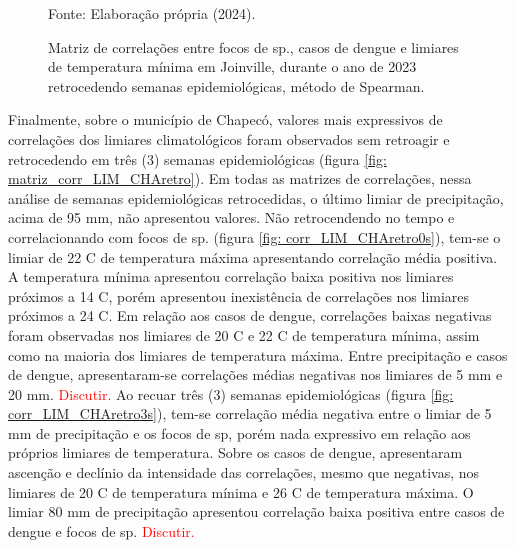 \documentclass[
	12pt,				%
	openright,			%
	oneside,			%
	a4paper,			%
	english,			%
	french,				%
	spanish,			%
	brazil				%
	dvipsnames, table]{abntex2}
\begin{document}
\begin{figure}[htbp]
    \begin{center}
    \caption{Matriz de correlações entre focos de  sp., casos de dengue e limiares de temperatura mínima em Joinville, durante o ano de 2023 retrocedendo semanas epidemiológicas, método de Spearman.}
    \label{fig: matriz_corr_LIM_JOItmax}
        \hfill
    \end{center}
    \small{Fonte: Elaboração própria (2024).}
\end{figure}


Finalmente, sobre o município de Chapecó, valores mais expressivos de correlações dos limiares climatológicos foram observados sem retroagir e retrocedendo em três (3) semanas epidemiológicas (figura \ref{fig: matriz_corr_LIM_CHAretro}). Em todas as matrizes de correlações, nessa análise de semanas epidemiológicas retrocedidas, o último limiar de precipitação, acima de 95 mm, não apresentou valores. Não retrocendendo no tempo e correlacionando com focos de  sp. (figura \ref{fig: corr_LIM_CHAretro0s}), tem-se o limiar de 22 C de temperatura máxima apresentando correlação média positiva. A temperatura mínima apresentou correlação baixa positiva nos limiares próximos a 14 C, porém apresentou inexistência de correlações nos limiares próximos a 24 C. Em relação aos casos de dengue, correlações baixas negativas foram observadas nos limiares de 20 C e 22 C de temperatura mínima, assim como na maioria dos limiares de temperatura máxima. Entre precipitação e casos de dengue, apresentaram-se correlações médias negativas nos limiares de 5 mm e 20 mm. \textcolor{red}{Discutir.} Ao recuar três (3) semanas epidemiológicas (figura \ref{fig: corr_LIM_CHAretro3s}), tem-se correlação média negativa entre o limiar de 5 mm de precipitação e os focos de  sp, porém nada expressivo em relação aos próprios limiares de temperatura. Sobre os casos de dengue, apresentaram ascenção e declínio da intensidade das correlações, mesmo que negativas, nos limiares de 20 C de temperatura mínima e 26 C de temperatura máxima. O limiar 80 mm de precipitação apresentou correlação baixa positiva entre casos de dengue e focos de  sp. \textcolor{red}{Discutir.}
\end{document}
